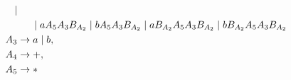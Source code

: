 \documentclass[12pt]{article}
\begin{document}
\begin{ejercicio}[2.5 puntos]
\begin{description}
\begin{align*}
                \mid \\ & \hspace{0.5cm}  \mid aA_5 A_3B_{A_2} \mid b A_5 A_3B_{A_2}\mid   a B_{A_2}A_5 A_3B_{A_2} \mid  b B_{A_2}A_5 A_3B_{A_2} \\
            \hspace{-2.5cm}A_3 &\to  a \mid b,\\
            \hspace{-2.5cm}A_4 &\to +,\\
            \hspace{-2.5cm}A_5 &\to *
        \end{align*}
        \end{description}
    \end{ejercicio}
\end{document}
